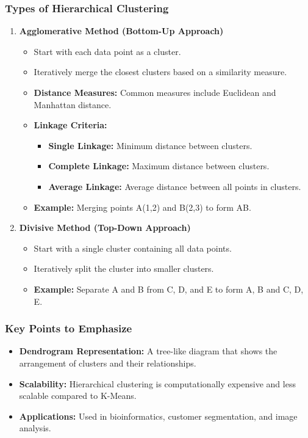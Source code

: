 \documentclass[aspectratio=169]{beamer}
\begin{document}
\begin{frame}[fragile]
    \frametitle{Types of Hierarchical Clustering}
    \begin{enumerate}
        \item \textbf{Agglomerative Method (Bottom-Up Approach)}
        \begin{itemize}
            \item Start with each data point as a cluster.
            \item Iteratively merge the closest clusters based on a similarity measure.
            \item \textbf{Distance Measures:} Common measures include Euclidean and Manhattan distance.
            \item \textbf{Linkage Criteria:}
                \begin{itemize}
                    \item \textbf{Single Linkage:} Minimum distance between clusters.
                    \item \textbf{Complete Linkage:} Maximum distance between clusters.
                    \item \textbf{Average Linkage:} Average distance between all points in clusters.
                \end{itemize}
            \item \textbf{Example:} Merging points A(1,2) and B(2,3) to form {AB}.
        \end{itemize}
        
        \item \textbf{Divisive Method (Top-Down Approach)}
        \begin{itemize}
            \item Start with a single cluster containing all data points.
            \item Iteratively split the cluster into smaller clusters.
            \item \textbf{Example:} Separate A and B from C, D, and E to form {A, B} and {C, D, E}.
        \end{itemize}
    \end{enumerate}
\end{frame}

\begin{frame}[fragile]
    \frametitle{Key Points to Emphasize}
    \begin{itemize}
        \item \textbf{Dendrogram Representation:} A tree-like diagram that shows the arrangement of clusters and their relationships.
        \item \textbf{Scalability:} Hierarchical clustering is computationally expensive and less scalable compared to K-Means.
        \item \textbf{Applications:} Used in bioinformatics, customer segmentation, and image analysis.
    \end{itemize}
\end{frame}
\end{document}
